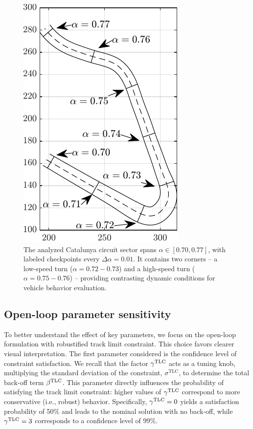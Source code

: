 \begin{figure}
	\centering
	\includegraphics{Fig/track.pdf}
	\caption{The analyzed Catalunya circuit sector spans $\alpha \in [0.70, 0.77]$, with labeled checkpoints every $\Delta\alpha = 0.01$. It contains two corners -- a low-speed turn ($\alpha = 0.72-0.73$) and a high-speed turn ($\alpha = 0.75-0.76$) -- providing contrasting dynamic conditions for vehicle behavior evaluation.}
	\label{fig:track}
\end{figure}

\subsection{Open-loop parameter sensitivity}
\label{sec:ol_param_sensitivity}
To better understand the effect of key parameters, we focus on the open-loop formulation with robustified track limit constraint. This choice favors clearer visual interpretation.
The first parameter considered is the confidence level of constraint satisfaction.
We recall that the factor $\gamma^\textrm{TLC}$ acts as a tuning knob, multiplying the standard deviation of the constraint, $\sigma^\textrm{TLC}$, to determine the total back-off term $\beta^\textrm{TLC}$.
This parameter directly influences the probability of satisfying the track limit constraint: higher values of $\gamma^\textrm{TLC}$ correspond to more conservative (i.e., robust) behavior.
Specifically, $\gamma^\textrm{TLC} = 0$ yields a satisfaction probability of 50\% and leads to the nominal solution with no back-off, while $\gamma^\textrm{TLC} = 3$ corresponds to a confidence level of 99\%.

